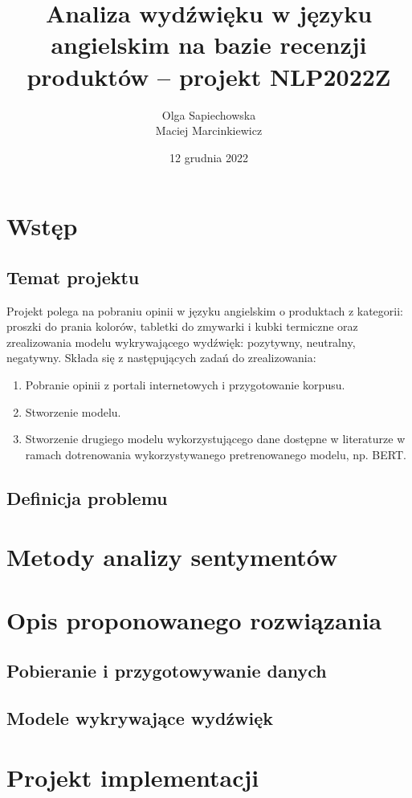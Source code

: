 \documentclass{article}
\title{Analiza wydźwięku w języku angielskim na bazie recenzji produktów -- projekt NLP2022Z}
\author{Olga Sapiechowska\\Maciej Marcinkiewicz}
\date{12 grudnia 2022}
\begin{document}
\maketitle

\section{Wstęp}

\subsection{Temat projektu}

Projekt polega na pobraniu opinii w języku angielskim o produktach z kategorii: proszki do prania kolorów, tabletki do zmywarki i kubki termiczne oraz zrealizowania modelu wykrywającego wydźwięk: pozytywny, neutralny, negatywny. Składa się z następujących zadań do zrealizowania:
\begin{enumerate}
    \item Pobranie opinii z portali internetowych i przygotowanie korpusu.
    \item Stworzenie modelu.
    \item Stworzenie drugiego modelu wykorzystującego dane dostępne w literaturze w ramach dotrenowania wykorzystywanego pretrenowanego modelu, np. BERT.
\end{enumerate}

\subsection{Definicja problemu}

\section{Metody analizy sentymentów}

\section{Opis proponowanego rozwiązania}

\subsection{Pobieranie i przygotowywanie danych}

\subsection{Modele wykrywające wydźwięk}

\section{Projekt implementacji}


\end{document}
